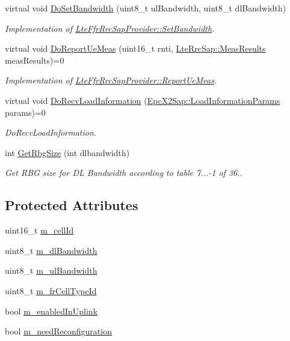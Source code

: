 \begin{DoxyCompactItemize}
virtual void \hyperlink{classns3_1_1LteFfrAlgorithm_aa52bdc04532f3ca97f2f97af1e1206ae}{Do\+Set\+Bandwidth} (uint8\+\_\+t ul\+Bandwidth, uint8\+\_\+t dl\+Bandwidth)
\begin{DoxyCompactList}\small\item\em Implementation of \hyperlink{classns3_1_1LteFfrRrcSapProvider_a6bc210245eab8838adb56297112752f3}{Lte\+Ffr\+Rrc\+Sap\+Provider\+::\+Set\+Bandwidth}. \end{DoxyCompactList}\item 
virtual void \hyperlink{classns3_1_1LteFfrAlgorithm_aae66b1b7edbacf07b96e171d89de3f91}{Do\+Report\+Ue\+Meas} (uint16\+\_\+t rnti, \hyperlink{structns3_1_1LteRrcSap_1_1MeasResults}{Lte\+Rrc\+Sap\+::\+Meas\+Results} meas\+Results)=0
\begin{DoxyCompactList}\small\item\em Implementation of \hyperlink{classns3_1_1LteFfrRrcSapProvider_aefa0779641b8432a7d3406b519ca7e59}{Lte\+Ffr\+Rrc\+Sap\+Provider\+::\+Report\+Ue\+Meas}. \end{DoxyCompactList}\item 
virtual void \hyperlink{classns3_1_1LteFfrAlgorithm_a11cec0ac90643836f31e9ad3f660b2b1}{Do\+Recv\+Load\+Information} (\hyperlink{structns3_1_1EpcX2Sap_1_1LoadInformationParams}{Epc\+X2\+Sap\+::\+Load\+Information\+Params} params)=0
\begin{DoxyCompactList}\small\item\em Do\+Recv\+Load\+Information. \end{DoxyCompactList}\item 
int \hyperlink{classns3_1_1LteFfrAlgorithm_a63ff51a7ceaa4a5274ed420df52b330d}{Get\+Rbg\+Size} (int dlbandwidth)
\begin{DoxyCompactList}\small\item\em Get R\+BG size for DL Bandwidth according to table 7...-\/1 of 36.. \end{DoxyCompactList}\end{DoxyCompactItemize}
\subsection*{Protected Attributes}
\begin{DoxyCompactItemize}
\item 
uint16\+\_\+t \hyperlink{classns3_1_1LteFfrAlgorithm_a0d6bc37b568679f27a18808d9cb36803}{m\+\_\+cell\+Id}
\item 
uint8\+\_\+t \hyperlink{classns3_1_1LteFfrAlgorithm_a97ab67b88f86f85337342478308efb0c}{m\+\_\+dl\+Bandwidth}
\item 
uint8\+\_\+t \hyperlink{classns3_1_1LteFfrAlgorithm_acfa0105633ee5c27538c3309eb132d21}{m\+\_\+ul\+Bandwidth}
\item 
uint8\+\_\+t \hyperlink{classns3_1_1LteFfrAlgorithm_a3d3f7443b41d708e0ac5504c7ed043b3}{m\+\_\+fr\+Cell\+Type\+Id}
\item 
bool \hyperlink{classns3_1_1LteFfrAlgorithm_a6c681821267dfedf7083600005db4bee}{m\+\_\+enabled\+In\+Uplink}
\item 
bool \hyperlink{classns3_1_1LteFfrAlgorithm_a2347323a45444ac4608678d92ee123f3}{m\+\_\+need\+Reconfiguration}
\end{DoxyCompactItemize}
